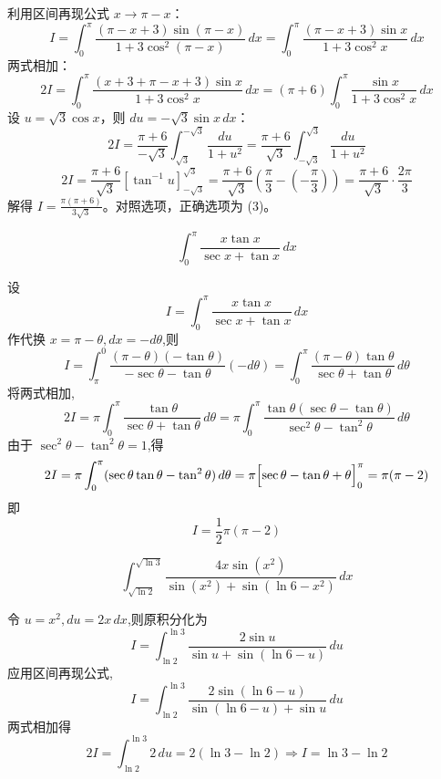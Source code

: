 \begin{questions}
\begin{solution}
利用区间再现公式 $x \to \pi - x$：
\[
I = \int_{0}^{\pi} \frac{(\pi - x + 3) \sin(\pi - x)}{1+3 \cos^2(\pi - x)} \,dx = \int_{0}^{\pi} \frac{(\pi - x + 3) \sin x}{1+3 \cos^2 x} \,dx
\]
两式相加：
\[
2I = \int_{0}^{\pi} \frac{(x+3 + \pi - x + 3) \sin x}{1+3 \cos^2 x} \,dx = (\pi + 6) \int_{0}^{\pi} \frac{\sin x}{1+3 \cos^2 x} \,dx
\]
设 $u = \sqrt{3} \cos x$，则 $du = -\sqrt{3} \sin x \,dx$：
\[
2I = \frac{\pi + 6}{-\sqrt{3}} \int_{\sqrt{3}}^{-\sqrt{3}} \frac{du}{1+u^2} = \frac{\pi + 6}{\sqrt{3}} \int_{-\sqrt{3}}^{\sqrt{3}} \frac{du}{1+u^2}
\]
\[
2I = \frac{\pi + 6}{\sqrt{3}} [\tan^{-1} u]_{-\sqrt{3}}^{\sqrt{3}} = \frac{\pi + 6}{\sqrt{3}} \left( \frac{\pi}{3} - (-\frac{\pi}{3}) \right) = \frac{\pi + 6}{\sqrt{3}} \cdot \frac{2\pi}{3}
\]
解得 $I = \frac{\pi(\pi + 6)}{3\sqrt{3}}$。对照选项，正确选项为 (3)。
\end{solution}
    \question
    \[
    \int_{0}^{\pi} \frac{x \tan x}{\sec x + \tan x} \, dx
    \]
    \begin{solution}
        设
        \[
        I = \int_{0}^{\pi} \frac{x \tan x}{\sec x + \tan x} \, dx
        \]
        作代换 $x = \pi - \theta, dx = -d\theta$,则
        \[
        I = \int_{\pi}^{0} \frac{(\pi-\theta)(-\tan\theta)}{-\sec\theta - \tan\theta} (-d\theta) = \int_{0}^{\pi} \frac{(\pi-\theta)\tan\theta}{\sec\theta + \tan\theta} \, d\theta
        \]
        将两式相加,
        \[
        2I = \pi \int_{0}^{\pi} \frac{\tan\theta}{\sec\theta + \tan\theta} \, d\theta = \pi \int_{0}^{\pi} \frac{\tan\theta(\sec\theta - \tan\theta)}{\sec^2\theta - \tan^2\theta} \, d\theta
        \]
        由于 $\sec^2\theta - \tan^2\theta = 1$,得
        \[
        2I = \pi \int_{0}^{\pi} (\sec\theta \tan\theta - \tan^2\theta) \, d\theta = \pi \Bigl[ \sec\theta - \tan\theta + \theta \Bigr]_{0}^{\pi} = \pi(\pi - 2)
        \]
        即
        \[
        I = \frac{1}{2}\pi(\pi-2)
        \]
    \end{solution}

    \question
    \[
    \int_{\sqrt{\ln 2}}^{\sqrt{\ln 3}} \frac{4x\sin(x^2)}{\sin(x^2) + \sin(\ln 6 - x^2)} \, dx
    \]
    \begin{solution}
        令 $u = x^2, du = 2x \,dx$,则原积分化为
        \[
        I = \int_{\ln 2}^{\ln 3} \frac{2\sin u}{\sin u + \sin(\ln 6 - u)} \, du
        \]
        应用区间再现公式,
        \[
        I = \int_{\ln 2}^{\ln 3} \frac{2\sin(\ln 6 - u)}{\sin(\ln 6 - u) + \sin u} \, du
        \]
        两式相加得
        \[
        2I = \int_{\ln 2}^{\ln 3} 2 \, du = 2(\ln 3 - \ln 2) \Rightarrow I = \ln 3 - \ln 2
        \]
    \end{solution}


\end{questions}
